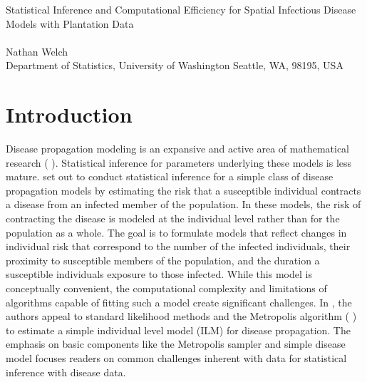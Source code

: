 \documentclass{uwstat572}
\newcommand{\vmadd}[1]{\textbf{\color{red}{#1}}}
\newcommand{\vmcomment}[1]{({\color{blue}{VM's comment:}} \textbf{\color{blue}{#1}})}
\begin{document}

\begin{center}
  {\LARGE Statistical Inference and Computational Efficiency for Spatial Infectious Disease Models with Plantation Data}\\\ \\
  {Nathan Welch \\ 
    Department of Statistics, University of Washington Seattle, WA, 98195, USA
  }
\end{center}

\begin{abstract}
This report examines the findings published in \textit{Statistical inference and computational efficiency for spatial infectious disease models with plantation data} \cite{Brown}. 
This paper aims to conduct statistical inference for parameters associated with a simple individual level infectious disease model. 
Model parameters are estimated using the Metropolis sampling algorithm; however, the computation burden created by fitting even a simple model leads to prohibitively long computation time. 
Statistical and computational methods to overcome the computing challenge are reviewed as a result. 
\vmcomment{Mention why this statistical problem is important in the abstract}
\end{abstract}

\section{Introduction}

Disease propagation modeling is an expansive and active area of mathematical research \vmcomment{add reference}.
Statistical inference for parameters underlying these models is less mature.
\vmadd{\citet{Brown}} set out to conduct statistical inference for a simple class of disease propagation models by estimating the risk that a susceptible individual contracts a disease from an infected member of the population. 
In these models, the risk of contracting the disease is modeled at the individual level rather than for the population as a whole. 
The goal is to formulate models that reflect changes in individual risk that correspond to the number of the infected individuals, their proximity to susceptible members of the population, and the duration a susceptible individuals  exposure to those infected. 
While this model is conceptually convenient, the computational complexity and limitations of algorithms capable of fitting such a model create significant challenges.
In \citep{Brown}, the authors appeal to standard likelihood methods and the Metropolis algorithm \vmcomment{add Metropolis et al.\ reference} to estimate \vmadd{parameters of} a simple individual level model (ILM) for disease propagation.
The emphasis on basic components like the Metropolis sampler and simple disease model focuses readers on common challenges inherent with data for statistical inference with \vmadd{infectious} disease data. 
\end{document}
